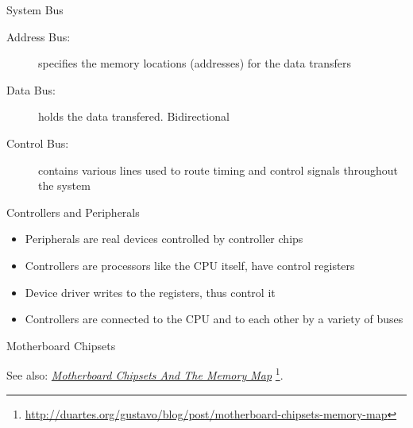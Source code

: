 \begin{frame}{System Bus}
  \begin{center}
  \end{center}
  \begin{description}
  \item[Address Bus:] specifies the memory locations (addresses) for the
    data transfers
  \item[Data Bus:] holds the data transfered. Bidirectional
  \item[Control Bus:] contains various lines used to route timing and
    control signals throughout the system
  \end{description}
\end{frame}

\begin{frame}{Controllers and Peripherals}
  \begin{itemize}
  \item Peripherals are real devices controlled by controller chips
  \item Controllers are processors like the CPU itself, have control registers
  \item Device driver writes to the registers, thus control it
  \item Controllers are connected to the CPU and to each other by a variety of buses
  \end{itemize}
\end{frame}

\begin{frame}
  \begin{center}
  \end{center}
\end{frame}

\begin{frame}{Motherboard Chipsets}
  \begin{center}
  \end{center}
\end{frame}

See also:
\href{http://duartes.org/gustavo/blog/post/motherboard-chipsets-memory-map}{\emph{Motherboard
    Chipsets And The Memory Map}}
\footnote{\url{http://duartes.org/gustavo/blog/post/motherboard-chipsets-memory-map}}.

